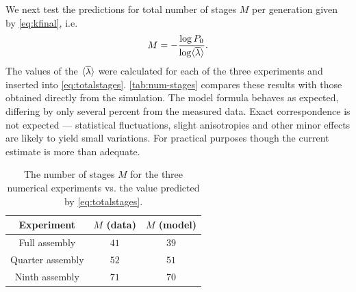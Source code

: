 We next test the predictions for total number of stages $M$ per generation given
by \eqref{eq:kfinal}, i.e.
\begin{equation}
  \label{eq:totalstages}
  M = -\frac{\log P_0}{\log \langle \overline{\lambda} \rangle}.
\end{equation}
The values of the $\langle \overline{\lambda} \rangle$ were calculated for each of the three experiments and
inserted into \eqref{eq:totalstages}. \autoref{tab:num-stages} compares these
results with those obtained directly from the simulation. The model formula
behaves as expected, differing by only several percent from the measured
data. Exact correspondence is not expected --- statistical fluctuations, slight
anisotropies and other minor effects are likely to yield small variations. For
practical purposes though the current estimate is more than adequate.
\begin{table}[htb]
  \centering
  \begin{tabular}{c c c}
    \toprule
    Experiment & $M$ (data) & $M$ (model)  \\
    \midrule
    Full assembly & $41$ & $39$  \\
    Quarter assembly & $52$ & $51$ \\
    Ninth assembly & $71$ & $70$  \\
    \bottomrule
  \end{tabular}
  \caption{The number of stages $M$ for the three numerical experiments vs. the
    value predicted by \eqref{eq:totalstages}.}
  \label{tab:num-stages}
\end{table}

